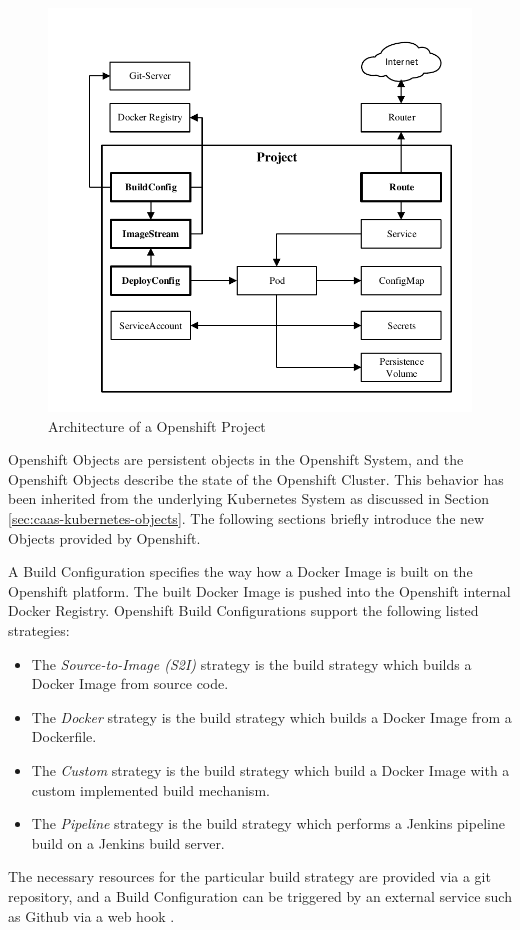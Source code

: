 \begin{figure}[htbp]
	\centering
	\includegraphics[scale=1]{images/openshift-project-architecture.pdf}
	\caption{Architecture of a Openshift Project}
	\label{fig:paas-openshift-project-architecture}
\end{figure} 

Openshift Objects are persistent objects in the Openshift System, and the Openshift Objects describe the state of the Openshift Cluster. This behavior has been inherited from the underlying Kubernetes System as discussed in Section \vref{sec:caas-kubernetes-objects}. The following sections briefly introduce the new Objects provided by Openshift. 

A Build Configuration specifies the way how a Docker Image is built on the Openshift platform. The built Docker Image is pushed into the Openshift internal Docker Registry. Openshift Build Configurations support the following listed strategies:
\begin{itemize}
	\item The \emph{Source-to-Image (S2I)} strategy is the build strategy which builds a Docker Image from source code.
	\item The \emph{Docker} strategy is the build strategy which builds a Docker Image from a Dockerfile.
	\item The \emph{Custom} strategy is the build strategy which build a Docker Image with a custom implemented build mechanism.
	\item The \emph{Pipeline} strategy is the build strategy which performs a Jenkins pipeline build on a Jenkins build server.
\end{itemize}
The necessary resources for the particular build strategy are provided via a git repository, and a Build Configuration can be triggered by an external service such as Github via a web hook \cite{S2I2018}. 


